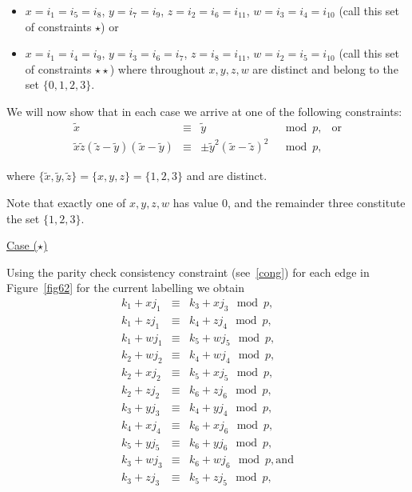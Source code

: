 \begin{itemize}
\item $x=i_1=i_5=i_8$, $y=i_7=i_9$, $z=i_2=i_6=i_{11}$,
$w=i_3=i_4=i_{10}$ (call this set of constraints $\star$) or \item
$x=i_1=i_4=i_9$, $y=i_3=i_6=i_7$, $z=i_8=i_{11}$,
$w=i_2=i_5=i_{10}$ (call this set of constraints $\star\star$)
where throughout $x,y,z,w$ are distinct and belong to the set
$\{0,1,2,3\}$.
\end{itemize}

We will now show that in each case we arrive at one of the following
constraints:
\begin{equation}\label{consti}
\begin{array}{ccccc}
\tilde{x} &\equiv& \tilde{y} &\mod p, &\text{or} \\
\tilde{x}\tilde{z}(\tilde{z}-\tilde{y})(\tilde{x}-\tilde{y})
&\equiv& \pm \tilde{y}^2(\tilde{x}-\tilde{z})^2  &\mod p, &{}
\end{array}
\end{equation}

where $\{\tilde{x},\tilde{y},\tilde{z}\} = \{x,y,z\}= \{1,2,3\}$ and
are distinct.

Note that exactly one of $x,y,z,w$ has value $0$, and the remainder
three constitute the set $\{1,2,3\}$.

\underline{Case ($\star$)}

Using the parity check consistency constraint (see~\eqref{cong}) for
each edge in Figure~\ref{fig62} for the current labelling we obtain
\begin{subequations}\begin{eqnarray}
\label{ar62a}k_1+xj_1 &\equiv& k_3+xj_3 \mod p, \\
\label{ar62b}k_1+zj_1 &\equiv& k_4+zj_4 \mod p, \\
\label{ar62c}k_1+wj_1 &\equiv& k_5+wj_5 \mod p, \\
\label{ar62d}k_2+wj_2 &\equiv& k_4+wj_4 \mod p, \\
\label{ar62e}k_2+xj_2 &\equiv& k_5+xj_5 \mod p, \\
\label{ar62f}k_2+zj_2 &\equiv& k_6+zj_6 \mod p, \\
\label{ar62g}k_3+yj_3 &\equiv& k_4+yj_4 \mod p, \\
\label{ar62h}k_4+xj_4 &\equiv& k_6+xj_6 \mod p, \\
\label{ar62i}k_5+yj_5 &\equiv& k_6+yj_6 \mod p, \\
\label{ar62j}k_3+wj_3 &\equiv& k_6+wj_6 \mod p,\text{and} \\
\label{ar62k}k_3+zj_3 &\equiv& k_5+zj_5 \mod p,
\end{eqnarray}\end{subequations}



